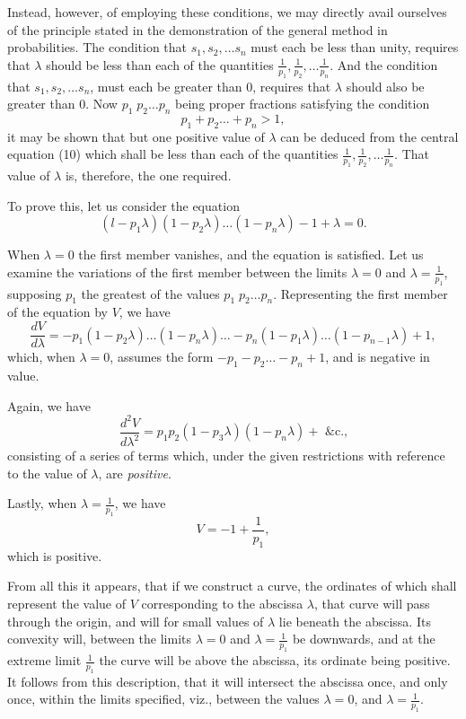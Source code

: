 \documentclass[oneside]{book}
\begin{document}
Instead, however, of employing these conditions, we may
directly avail ourselves of the principle stated in the demonstration of the general method in probabilities. The condition
that $s_1, s_2, \dotsc s_n$ must each be less than unity, requires that $\lambda$
should be less than each of the quantities
$\frac{1}{p_1}, \frac{1}{p_2}, \dotsc \frac{1}{p_n}$. And
the condition that $s_1, s_2, \dotsc s_n$, must each be greater than 0, requires that $\lambda$ should also be greater than 0. Now
$p_1 \; p_2 \dotsc p_n$
being proper fractions satisfying the condition
\[
  p_1 + p_2 \dotsc + p_n > 1,
\]
it may be shown that but one positive value of $\lambda$ can be deduced
from the central equation (10) which shall be less than each of
the quantities
$\frac{1}{p_1}, \frac{1}{p_2}, \dotsc \frac{1}{p_n}$. That value of $\lambda$ is, therefore, the
one required.

To prove this, let us consider the equation
\[
  (l - p_1\lambda)(1 - p_2\lambda) \dotsc (1 - p_n\lambda)
  - 1  + \lambda = 0.
\]

When $\lambda = 0$ the first member vanishes, and the equation is
satisfied. Let us examine the variations of the first member
between the limits $\lambda = 0$ and $\lambda = \frac{1}{p_1}$, supposing $p_1$ the greatest of
the values $p_1 \; p_2 \dotsc p_n$.
Representing the first member of the equation by $V$, we have
\[
  \frac{dV}{d\lambda}
  = -p_1(1-p_2\lambda) \dotsc (1-p_n\lambda) \dotsc
    -p_n(1-p_1\lambda) \dotsc (1-p_{n-1}\lambda) + 1,
\]
which, when $\lambda = 0$, assumes the form
$-p_1 - p_2 \dotsc - p_n + 1$, and
is negative in value.

Again, we have
\[
  \frac{d^2V}{d\lambda^2}
  = p_1p_2(1-p_3\lambda)(1-p_n\lambda) + \text{ \&c.,}
\]
consisting of a series of terms which, under the given restrictions
with reference to the value of $\lambda$, are \emph{positive}.

Lastly, when $\lambda = \frac{1}{p_1}$, we have
\[
  V = -1 + \frac{1}{p_1},
\]
which is positive.

From all this it appears, that if we construct a curve, the ordinates of which shall represent the value of $V$ corresponding to
the abscissa $\lambda$, that curve will pass through the origin, and will
for small values of $\lambda$ lie beneath the abscissa. Its convexity will,
between the limits $\lambda = 0$ and $\lambda = \frac{1}{p_1}$ be downwards, and at the
extreme limit $\frac{1}{p_1}$ the curve will be above the abscissa, its ordinate
being positive. It follows from this description, that it will intersect the abscissa once, and only once, within the limits specified, viz., between the values $\lambda = 0$, and
$\lambda = \frac{1}{p_1}$.
\end{document}
